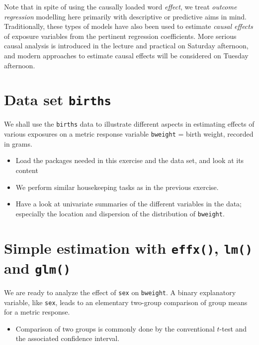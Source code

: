 \documentclass[
]{book}
\providecommand{\tightlist}{%
  \setlength{\itemsep}{0pt}\setlength{\parskip}{0pt}}
\begin{document}
Note that in spite of using the causally loaded word \emph{effect},
we treat \emph{outcome regression} modelling
here primarily with descriptive or predictive aims in mind.
Traditionally, these types of models have also been used
to estimate \emph{causal effects} of exposure variables
from the pertinent regression coefficients.
More serious causal analysis is introduced in the lecture and practical
on Saturday afternoon, and modern approaches
to estimate causal effects will be considered
on Tuesday afternoon.

\section{\texorpdfstring{Data set \texttt{births}}{Data set births}}\label{data-set-births}

We shall use the \texttt{births} data to illustrate
different aspects in estimating effects of various exposures on a metric response variable
\texttt{bweight} = birth weight, recorded in grams.

\begin{itemize}
\item
  Load the packages needed in this exercise and the data set, and look at its content
\item
  We perform similar housekeeping tasks as in the previous exercise.
\item
  Have a look at univariate summaries of the different
  variables in the data; especially
  the location and dispersion of the distribution of \texttt{bweight}.
\end{itemize}

\section{\texorpdfstring{Simple estimation with \texttt{effx()}, \texttt{lm()} and \texttt{glm()}}{Simple estimation with effx(), lm() and glm()}}\label{simple-estimation-with-effx-lm-and-glm}

We are ready to analyze the effect of \texttt{sex} on \texttt{bweight}.
A binary explanatory variable, like \texttt{sex}, leads to an elementary
two-group comparison of group
means for a metric response.

\begin{itemize}
\tightlist
\item
  Comparison of two groups is commonly done by the conventional \(t\)-test and
  the associated confidence interval.
\end{itemize}
\end{document}
